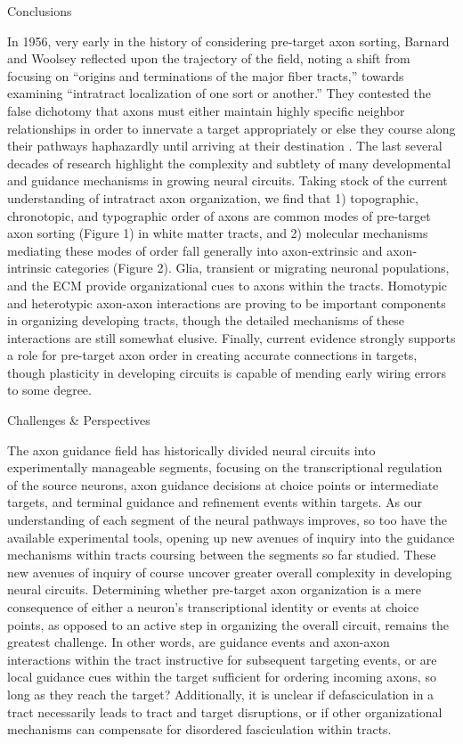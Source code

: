 Conclusions

In 1956, very early in the history of considering pre-target axon sorting, Barnard and Woolsey reflected upon the trajectory of the field, noting a shift from focusing on “origins and terminations of the major fiber tracts,” towards examining “intratract localization of one sort or another.”
They contested the false dichotomy that axons must either maintain highly specific neighbor relationships in order to innervate a target appropriately or else they course along their pathways haphazardly until arriving at their destination \cite{barnard1956study}.
The last several decades of research highlight the complexity and subtlety of many developmental and guidance mechanisms in growing neural circuits.
Taking stock of the current understanding of intratract axon organization, we find that 1) topographic, chronotopic, and typographic order of axons are common modes of pre-target axon sorting (Figure 1) in white matter tracts, and 2) molecular mechanisms mediating these modes of order fall generally into axon-extrinsic and axon-intrinsic categories (Figure 2).
Glia, transient or migrating neuronal populations, and the ECM provide organizational cues to axons within the tracts.
Homotypic and heterotypic axon-axon interactions are proving to be important components in organizing developing tracts, though the detailed mechanisms of these interactions are still somewhat elusive.
Finally, current evidence strongly supports a role for pre-target axon order in creating accurate connections in targets, though plasticity in developing circuits is capable of mending early wiring errors to some degree.


Challenges \& Perspectives

The axon guidance field has historically divided neural circuits into experimentally manageable segments, focusing on the transcriptional regulation of the source neurons, axon guidance decisions at choice points or intermediate targets, and terminal guidance and refinement events within targets.
As our understanding of each segment of the neural pathways improves, so too have the available experimental tools, opening up new avenues of inquiry into the guidance mechanisms within tracts coursing between the segments so far studied.
These new avenues of inquiry of course uncover greater overall complexity in developing neural circuits.
Determining whether pre-target axon organization is a mere consequence of either a neuron’s transcriptional identity or events at choice points, as opposed to an active step in organizing the overall circuit, remains the greatest challenge.
In other words, are guidance events and axon-axon interactions within the tract instructive for subsequent targeting events, or are local guidance cues within the target sufficient for ordering incoming axons, so long as they reach the target?
Additionally, it is unclear if defasciculation in a tract necessarily leads to tract and target disruptions, or if other organizational mechanisms can compensate for disordered fasciculation within tracts.

